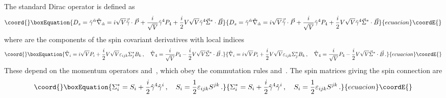 \documentclass[a4paper,12pt]{article}
\begin{document}
The standard Dirac operator is defined as \cite{CV2}
\begin{equation}\coord{}\boxEquation{\label{(de)}
{D}_{s}=\hat\gamma^{\hat\alpha}\hat\nabla_{\hat\alpha}  
=i\sqrt{V}\vec{\hat\gamma}\cdot\vec{P}
+\frac{i}{\sqrt{V}}\hat\gamma^{4}P_{4}
+\frac{i}{2} V\sqrt{V}\hat\gamma^{4}\vec{\Sigma}^{*}\cdot\vec{B}
}{{D}_{s}=\hat\gamma^{\hat\alpha}\hat\nabla_{\hat\alpha}  
=i\sqrt{V}\vec{\hat\gamma}\cdot\vec{P}
+\frac{i}{\sqrt{V}}\hat\gamma^{4}P_{4}
+\frac{i}{2} V\sqrt{V}\hat\gamma^{4}\vec{\Sigma}^{*}\cdot\vec{B}
}{ecuacion}\coordE{}\end{equation}
where  \myHighlight{$\hat\nabla_{\hat\alpha}$}\coordHE{} are the components of the  
spin covariant derivatives with local indices 
\begin{equation}\coord{}\boxEquation{\label{sder}
\hat\nabla_{i}=i\sqrt{V}P_{i}+\frac{i}{2}V\sqrt{V}\varepsilon_{ijk}
\Sigma_{j}^{*}B_{k}\,,\quad
\hat\nabla_{4}=\frac{i}{\sqrt{V}}P_{4}-\frac{i}{2}V\sqrt{V}
\vec{\Sigma}^{*}\cdot\vec{B}\,.
}{\hat\nabla_{i}=i\sqrt{V}P_{i}+\frac{i}{2}V\sqrt{V}\varepsilon_{ijk}
\Sigma_{j}^{*}B_{k}\,,\quad
\hat\nabla_{4}=\frac{i}{\sqrt{V}}P_{4}-\frac{i}{2}V\sqrt{V}
\vec{\Sigma}^{*}\cdot\vec{B}\,.
}{ecuacion}\coordE{}\end{equation}
These depend on the momentum operators  
\coordHE{} and \coordHE{}\,,
which obey the commutation rules
\coordHE{} and
\coordHE{}\,. 
The spin matrices giving the spin connection are  
\begin{equation}\coord{}\boxEquation{\label{sigst}
\Sigma_{i}^{*}=S_{i}+\frac{i}{2}\hat\gamma^{4}\hat\gamma^{i} \,, \quad
S_{i}=\frac{1}{2}\varepsilon_{ijk}S^{jk}\,.
}{\Sigma_{i}^{*}=S_{i}+\frac{i}{2}\hat\gamma^{4}\hat\gamma^{i} \,, \quad
S_{i}=\frac{1}{2}\varepsilon_{ijk}S^{jk}\,.
}{ecuacion}\coordE{}\end{equation}
\end{document}
